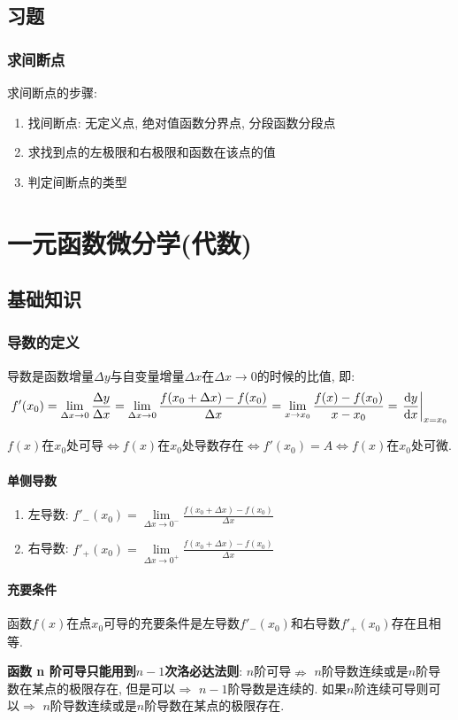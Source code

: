 \section{习题}
\subsection{求间断点}
求间断点的步骤:
\begin{enumerate}
\item 找间断点: 无定义点, 绝对值函数分界点, 分段函数分段点
\item 求找到点的左极限和右极限和函数在该点的值
\item 判定间断点的类型
\end{enumerate}
\chapter{一元函数微分学(代数)}
\section{基础知识}
\subsection{导数的定义}
导数是函数增量$ \Delta y $与自变量增量$ \Delta x $在$ \Delta x \rightarrow 0 $的时候的比值, 即:
\begin{equation*}
f'(x_{0})=\lim\limits_{\Delta x\rightarrow 0}\frac{\Delta y}{\Delta x}=\lim\limits_{\Delta x\rightarrow 0}\frac{f(x_{0}+\Delta x)-f(x_{0})}{\Delta x}=\lim\limits_{x\rightarrow x_{0}}\frac{f(x)-f(x_{0})}{x-x_{0}}=\left.\dv{y}{x}\right|_{x=x_{0}}
\end{equation*}\par 
$ f(x) $在$ x_{0} $处可导$ \Leftrightarrow f(x)$在$ x_{0} $处导数存在$ \Leftrightarrow f'(x_{0})=A \Leftrightarrow f(x) $在$ x_{0} $处可微.
\subsubsection{单侧导数}
\begin{enumerate}
\item 左导数: $ f'_{-}(x_{0})=\lim\limits_{\Delta x\rightarrow 0^{-}}\frac{f(x_{0}+\Delta x)-f(x_{0})}{\Delta x} $
\item 右导数: $ f'_{+}(x_{0})=\lim\limits_{\Delta x\rightarrow 0^{+}}\frac{f(x_{0}+\Delta x)-f(x_{0})}{\Delta x} $
\end{enumerate}
\subsubsection{充要条件}
函数$ f(x) $在点$ x_{0} $可导的充要条件是左导数$ f'_{-}(x_{0}) $和右导数$ f'_{+}(x_{0}) $存在且相等.
\begin{tcolorbox}
\textbf{函数$ $ n $ $阶可导只能用到$ n-1 $次洛必达法则}:  $ n $阶可导$ \nRightarrow $ $ n $阶导数连续或是$ n $阶导数在某点的极限存在, 但是可以$ \Rightarrow $ $ n-1 $阶导数是连续的. 如果$ n $阶连续可导则可以$ \Rightarrow $ $ n $阶导数连续或是$ n $阶导数在某点的极限存在.
\end{tcolorbox}
